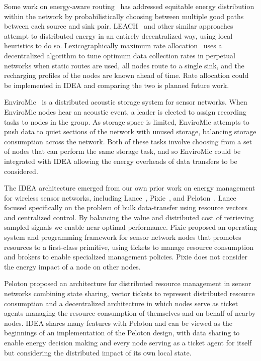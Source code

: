 \documentclass{sig-alternate}
\begin{document}
Some work on energy-aware routing~\cite{ShahRabaey2002,381685} has addressed
equitable energy distribution within the network by probabilistically
choosing between multiple good paths between each source and sink pair.
LEACH~\cite{leach} and other similar approaches attempt to distributed energy
in an entirely decentralized way, using local heuristics to do so.
Lexicographically maximum rate allocation~\cite{fair-rate-allocation} uses a
decentralized algorithm to tune optimum data collection rates in perpetual
networks when static routes are used, all nodes route to a single sink, and
the recharging profiles of the nodes are known ahead of time. Rate allocation
could be implemented in IDEA and comparing the two is planned future work.

EnviroMic~\cite{enviromic} is a distributed acoustic storage system for
sensor networks. When EnviroMic nodes hear an acoustic event, a leader is
elected to assign recording tasks to nodes in the group. As storage space is
limited, EnviroMic attempts to push data to quiet sections of the network
with unused storage, balancing storage consumption across the network. Both
of these tasks involve choosing from a set of nodes that can perform the same
storage task, and so EnviroMic could be integrated with IDEA allowing the
energy overheads of data transfers to be considered.

The IDEA architecture emerged from our own prior work on energy management
for wireless sensor networks, including Lance~\cite{lance-sensys08},
Pixie~\cite{pixie-sensys08}, and Peloton~\cite{peloton-hotos09}. Lance
focused specifically on the problem of bulk data-transfer using resource
vectors and centralized control. By balancing the value and distributed
cost of retrieving sampled signals we enable near-optimal performance.
Pixie proposed an operating system and programming framework for sensor
network nodes that promotes resources to a first-class primitive, using
tickets to manage resource consumption and brokers to enable specialized
management policies. Pixie does not consider the energy impact of a node on
other nodes.

Peloton proposed an architecture for distributed resource management in
sensor networks combining state sharing, vector tickets to represent
distributed resource consumption and a decentralized architecture in which
nodes serve as ticket agents managing the resource consumption of themselves
and on behalf of nearby nodes. IDEA shares many features with Peloton and can
be viewed as the beginnings of an implementation of the Peloton design, with
data sharing to enable energy decision making and every node serving as a
ticket agent for itself but considering the distributed impact of its own
local state.
\vfill\eject
\end{document}
